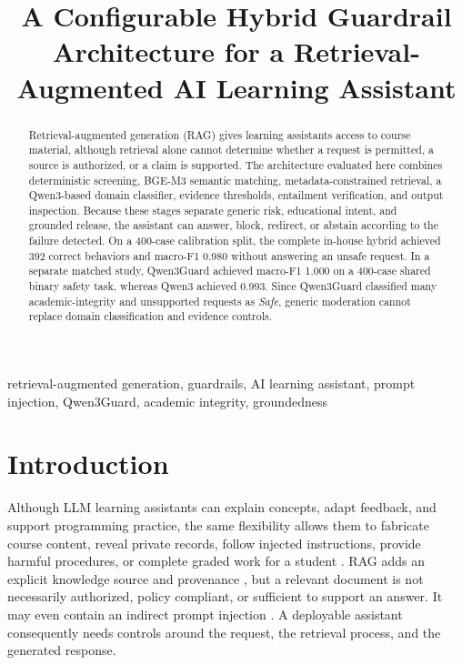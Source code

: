 \documentclass[conference,a4paper]{IEEEtran}
\title{A Configurable Hybrid Guardrail Architecture for a Retrieval-Augmented AI Learning Assistant}
\author{
\IEEEauthorblockN{Katerina Zhittsova}
\IEEEauthorblockA{AI Engineering\\
\url{https://zhittsova.com}}
}
\begin{document}
\maketitle

\begin{abstract}
Retrieval-augmented generation (RAG) gives learning assistants access to course material, although retrieval alone cannot determine whether a request is permitted, a source is authorized, or a claim is supported. The architecture evaluated here combines deterministic screening, BGE-M3 semantic matching, metadata-constrained retrieval, a Qwen3-based domain classifier, evidence thresholds, entailment verification, and output inspection. Because these stages separate generic risk, educational intent, and grounded release, the assistant can answer, block, redirect, or abstain according to the failure detected. On a 400-case calibration split, the complete in-house hybrid achieved 392 correct behaviors and macro-F1 0.980 without answering an unsafe request. In a separate matched study, Qwen3Guard achieved macro-F1 1.000 on a 400-case shared binary safety task, whereas Qwen3 achieved 0.993. Since Qwen3Guard classified many academic-integrity and unsupported requests as \emph{Safe}, generic moderation cannot replace domain classification and evidence controls.
\end{abstract}

\begin{IEEEkeywords}
retrieval-augmented generation, guardrails, AI learning assistant, prompt injection, Qwen3Guard, academic integrity, groundedness
\end{IEEEkeywords}

\section{Introduction}

Although LLM learning assistants can explain concepts, adapt feedback, and support programming practice, the same flexibility allows them to fabricate course content, reveal private records, follow injected instructions, provide harmful procedures, or complete graded work for a student \cite{wang2024llmedu,yan2023education}. RAG adds an explicit knowledge source and provenance \cite{lewis2020rag}, but a relevant document is not necessarily authorized, policy compliant, or sufficient to support an answer. It may even contain an indirect prompt injection \cite{greshake2023indirect}. A deployable assistant consequently needs controls around the request, the retrieval process, and the generated response.
\end{document}
